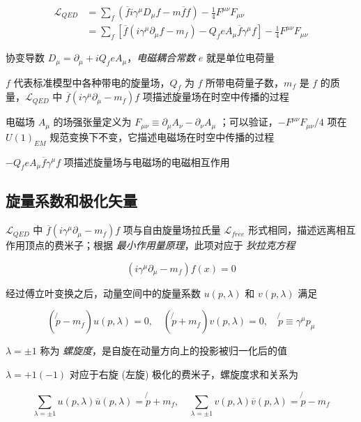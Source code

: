 \documentclass[oneside,a4paper,openany,11pt]{ctexbook}
\begin{document}
\begin{align}
    \mathcal{L}_{QED} &= \sum_f (\overline{f} i \gamma^\mu D_\mu f - m \overline{f} f) - \frac{1}{4} F^{\mu\nu} F_{\mu\nu} \\
    &= \sum_f \left[\overline{f} (i \gamma^\mu \partial_\mu f - m_f) - Q_f e A_\mu \overline{f}\gamma^\mu f\right] - \frac{1}{4} F^{\mu\nu} F_{\mu\nu}
\end{align}

协变导数 $D_\mu = \partial_\mu + i Q_f e A_\mu$，\emph{电磁耦合常数} $e$ 就是单位电荷量

$f$ 代表标准模型中各种带电的旋量场，$Q_f$ 为 $f$ 所带电荷量子数，$m_f$ 是 $f$ 的质量，$\mathcal{L}_{QED}$ 中 $\overline{f} (i \gamma^\mu \partial_\mu - m_f) f$ 项描述旋量场在时空中传播的过程

电磁场 $A_\mu$ 的场强张量定义为 $F_{\mu\nu} \equiv \partial_\mu A_\nu - \partial_\nu A_\mu$ ；可以验证，$-F^{\mu\nu} F_{\mu\nu}/4$ 项在$U(1)_{EM}$ 规范变换下不变，它描述电磁场在时空中传播的过程

$- Q_f e A_\mu \overline{f}\gamma^\mu f$ 项描述旋量场与电磁场的电磁相互作用

\subsection{旋量系数和极化矢量}

$\mathcal{L}_{QED}$ 中 $\overline{f} (i \gamma^\mu \partial_\mu - m_f)f$ 项与自由旋量场拉氏量 $\mathcal{L}_{free}$ 形式相同，描述远离相互作用顶点的费米子；根据 \emph{最小作用量原理}，此项对应于 \emph{狄拉克方程}

\begin{equation}
    (i\gamma^\mu \partial_\mu - m_f) f(x) = 0
\end{equation}

经过傅立叶变换之后，动量空间中的旋量系数 $u(p, \lambda)$ 和 $v(p, \lambda)$ 满足

\begin{equation}
    (\not{p} - m_f) u(p, \lambda) = 0, \quad (\not{p} + m_f) v(p, \lambda) = 0, \quad \not{p} \equiv \gamma^\mu p_\mu
\end{equation}

$\lambda = \pm 1$ 称为 \emph{螺旋度}，是自旋在动量方向上的投影被归一化后的值

$\lambda = +1 (-1)$ 对应于右旋 (左旋) 极化的费米子，螺旋度求和关系为

\begin{equation}
    \sum_{\lambda=\pm 1} u(p, \lambda) \overline{u}(p, \lambda) = \not{p} + m_f, \quad \sum_{\lambda=\pm 1} v(p, \lambda) \overline{v}(p, \lambda) = \not{p} - m_f
\end{equation}
\end{document}
